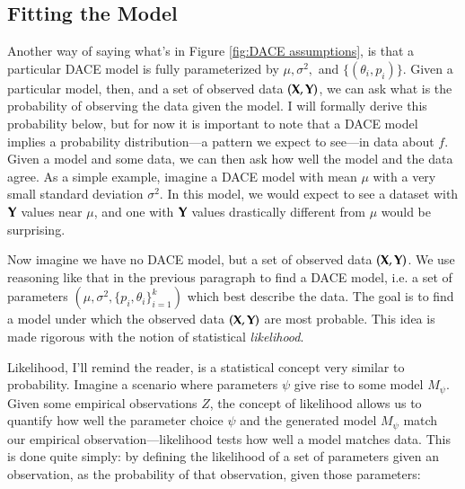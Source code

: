 

\subsection{Fitting the Model}\label{sec:max_lik}
Another way of saying what's in Figure \ref{fig:DACE assumptions}, is that a particular DACE model is fully parameterized by $\mu, \sigma^2,$ and $\{(\theta_i,p_i)\}$. Given a particular model, then, and a set of observed data $(\mathbf{X},\mathbf{Y})$, we can ask what is the probability of observing the data given the model. I will formally derive this probability below, but for now it is important to note that a DACE model implies a probability distribution---a pattern we expect to see---in data about $f$. Given a model and some data, we can then ask how well the model and the data agree. As a simple example, imagine a DACE model with mean $\mu$ with a very small standard deviation $\sigma^2$. In this model, we would expect to see a dataset with $\mathbf{Y}$ values near $\mu$, and one with $\mathbf{Y}$ values drastically different from $\mu$ would be surprising. 

Now imagine we have no DACE model, but a set of observed data $(\mathbf{X},\mathbf{Y})$. We use reasoning like that in the previous paragraph to find a DACE model, i.e. a set of parameters $(\mu,\sigma^2,\{p_i,\theta_i\}_{i=1}^k)$ which best describe the data. The goal is to find a model under which the observed data $(\mathbf{X},\mathbf{Y})$ are most probable. This idea is made rigorous with the notion of statistical \emph{likelihood}.

Likelihood, I'll remind the reader, is a statistical concept very similar to probability. %
Imagine a scenario where parameters $\psi$ give rise to some model $M_\psi$. Given some empirical observations $Z$, the concept of likelihood allows us to quantify how well the parameter choice $\psi$ and the generated model $M_\psi$ match our empirical observation---likelihood tests how well a model matches data. This is done quite simply: by defining the likelihood of a set of parameters given an observation, as the probability of that observation, given those parameters:

